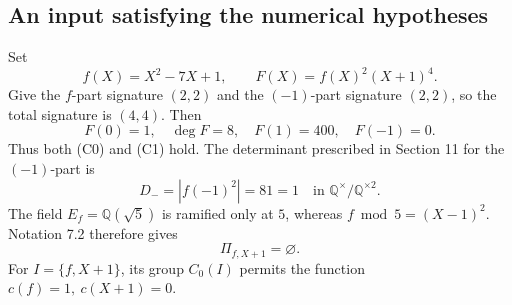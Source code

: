 \documentclass[10pt]{article}
\begin{document}
\subsection*{An input satisfying the numerical hypotheses}
Set \[f(X)=X^2-7X+1,\qquad F(X)=f(X)^2(X+1)^4.\] Give the \(f\)-part signature \((2,2)\) and the \((-1)\)-part signature \((2,2)\), so the total signature is \((4,4)\). Then \[F(0)=1,\quad \deg F=8,\quad F(1)=400,\quad F(-1)=0.\] Thus both (C0) and (C1) hold. The determinant prescribed in Section 11 for the \((-1)\)-part is \[D_-=|f(-1)^2|=81=1\quad\text{in }\mathbb Q^\times/\mathbb Q^{\times2}.\] The field \(E_f=\mathbb Q(\sqrt5)\) is ramified only at \(5\), whereas \(f\bmod5=(X-1)^2\). Notation 7.2 therefore gives \[\Pi_{f,X+1}=\varnothing.\] For \(I=\{f,X+1\}\), its group \(C_0(I)\) permits the function \(c(f)=1,\ c(X+1)=0\).\par
\end{document}
